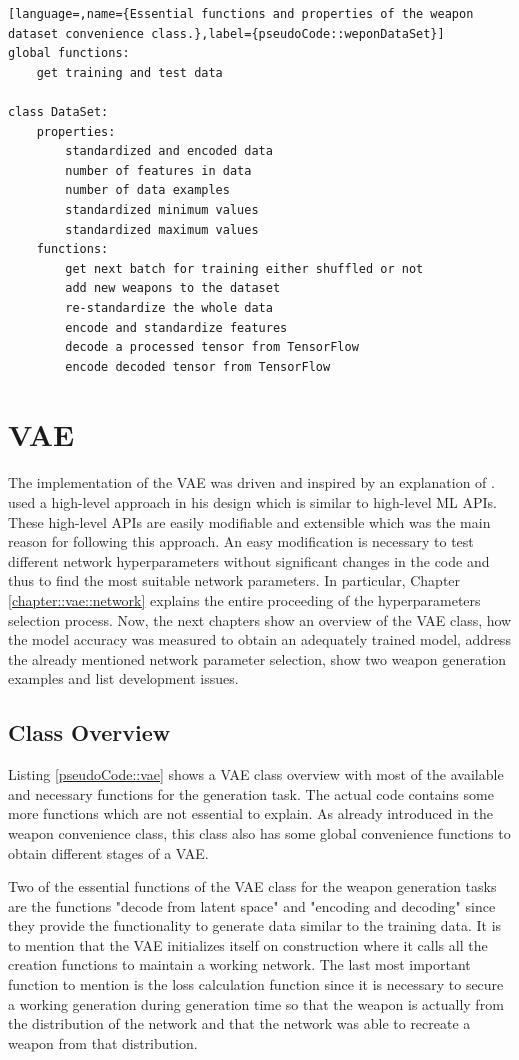 \documentclass[MGS,Master,english]{twbook}%
\begin{document}
\begin{lstlisting}[language=,name={Essential functions and properties of the weapon dataset convenience class.},label={pseudoCode::weponDataSet}]
global functions:
	get training and test data
	
class DataSet:
	properties:
		standardized and encoded data
		number of features in data
		number of data examples
		standardized minimum values
		standardized maximum values 
	functions:
		get next batch for training either shuffled or not
		add new weapons to the dataset
		re-standardize the whole data
		encode and standardize features
		decode a processed tensor from TensorFlow
		encode decoded tensor from TensorFlow
\end{lstlisting}

\section{\acl{VAE}}
The implementation of the VAE was driven and inspired by an explanation of \citep{tutorial::vaeTF}.  used a high-level approach in his design which is similar to high-level ML APIs. These high-level APIs are easily modifiable and extensible which was the main reason for following this approach. An easy modification is necessary to test different network hyperparameters without significant changes in the code and thus to find the most suitable network parameters. In particular, Chapter \ref{chapter::vae::network} explains the entire proceeding of the hyperparameters selection process. Now, the next chapters show an overview of the VAE class, how the model accuracy was measured to obtain an adequately trained model, address the already mentioned network parameter selection, show two weapon generation examples and list development issues.

\subsection{Class Overview}
Listing \ref{pseudoCode::vae} shows a VAE class overview with most of the available and necessary functions for the generation task. The actual code contains some more functions which are not essential to explain. As already introduced in the weapon convenience class, this class also has some global convenience functions to obtain different stages of a VAE. 

Two of the essential functions of the VAE class for the weapon generation tasks are the functions "decode from latent space" and "encoding and decoding" since they provide the functionality to generate data similar to the training data. It is to mention that the VAE initializes itself on construction where it calls all the creation functions to maintain a working network. The last most important function to mention is the loss calculation function since it is necessary to secure a working generation during generation time so that the weapon is actually from the distribution of the network and that the network was able to recreate a weapon from that distribution.
\end{document}
